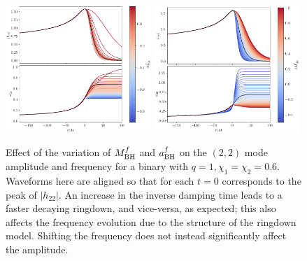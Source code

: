 \documentclass[prd,amssymb,amsmath,amsfonts,nofootinbib,reprint,showpacs,longbibliography]{revtex4-1}
\def\mbhf{M_{\rm BH}^f}
\def\abhf{a_{\rm BH}^f}
\begin{document}
\begin{figure}
    \includegraphics[width=0.49\textwidth]{figs/delta_abhf_-0.9_0.16.png}
    \includegraphics[width=0.49\textwidth]{figs/delta_Mbhf_-0.5_1.0.png}
    \caption{\label{fig:remnantdev}
    Effect of the variation of $\mbhf$ and $\abhf$ on the $(2,2)$ mode amplitude and frequency
    for a binary with $q = 1, \chi_1 = \chi_2 = 0.6$. Waveforms here are aligned so that for each
    $t = 0$ corresponds to the peak of $|h_{22}|$. An increase in the inverse damping time leads to a faster
    decaying ringdown, and vice-versa, as expected; this also affects the frequency evolution due to the structure of the
    ringdown model. Shifting the frequency does not instead significantly affect the amplitude.}
\end{figure}
\end{document}
